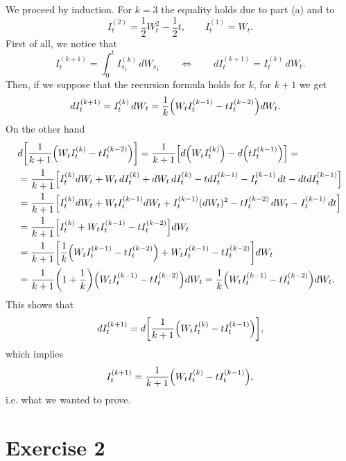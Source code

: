 \documentclass[a4paper,11pt]{article}
\theoremstyle{definition}
\theoremstyle{plain}
\theoremstyle{remark}
\DeclarePairedDelimiter{\parr}{(}{)}
\DeclarePairedDelimiter{\parq}{[}{]}
\begin{document}
We proceed by induction. For $k=3$ the equality holds due to part (a) and to 
$$
I^{(2)}_t = \frac{1}{2}W_t^2-\frac{1}{2}t,\qquad I^{(1)}_t = W_t.
$$
First of all, we notice that
$$
I_t^{(k+1)} = \int_0^tI_{s_1}^{(k)}\,dW_{s_1} \qquad\Longleftrightarrow\qquad dI_t^{(k+1)} = I_t^{(k)}\,dW_t.
$$
Then, if we suppose that the recursion formula holds for $k$, for $k+1$ we get
\begin{align*}
dI_t^{(k+1)} & = I_t^{(k)}\,dW_t = \frac{1}{k}\parr*{W_tI_t^{(k-1)}-tI_t^{(k-2)}}dW_t. 
\end{align*}
On the other hand
\begin{align*}
& d\parq*{\frac{1}{k+1}\parr*{W_tI_t^{(k)}-tI_t^{(k-2)}}} = \frac{1}{k+1}\parq*{d\parr*{W_tI_t^{(k)}}-d\parr*{tI_t^{(k-1)}}} = \\ &  = \frac{1}{k+1}\Big[I_t^{(k)}dW_t+W_t\,dI_t^{(k)}+dW_t\,dI_t^{(k)}-tdI_t^{(k-1)}-I_t^{(k-1)}\,dt -dtdI_t^{(k-1)}\Big] \\ & = \frac{1}{k+1}\parq*{I^{(k)}_tdW_t+W_tI^{(k-1)}_tdW_t + I^{(k-1)}_t(dW_t)^2-tI_t^{(k-2)}\,dW_t-I_t^{(k-1)}\,dt} \\ & = \frac{1}{k+1}\parq*{I^{(k)}_t+W_tI^{(k-1)}_t -tI_t^{(k-2)}}dW_t \\ & = \frac{1}{k+1}\parq*{\frac{1}{k}\parr*{W_tI^{(k-1)}_t -tI_t^{(k-2)}}+W_tI^{(k-1)}_t -tI_t^{(k-2)}}dW_t \\ & = \frac{1}{k+1}\parr*{1+\frac{1}{k}}\parr*{W_tI^{(k-1)}_t -tI_t^{(k-2)}}dW_t = \frac{1}{k}\parr*{W_tI_t^{(k-1)}-tI_t^{(k-2)}}dW_t.
\end{align*}
This shows that 
$$
dI_t^{(k+1)} = d\parq*{\frac{1}{k+1}\parr*{W_tI_t^{(k)}-tI_t^{(k-1)}}},
$$
which implies
$$
I_t^{(k+1)} = \frac{1}{k+1}\parr*{W_tI_t^{(k)}-tI_t^{(k-1)}},
$$
i.e. what we wanted to prove.

\section*{Exercise 2}
\end{document}

